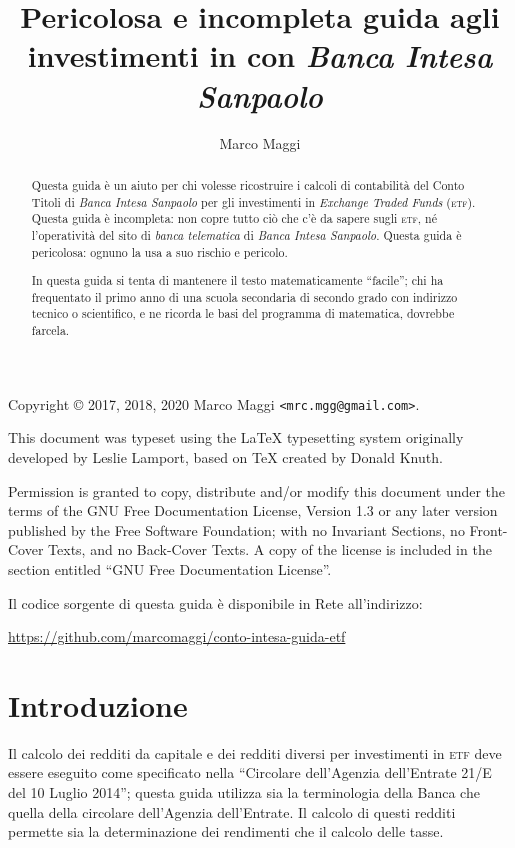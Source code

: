 \documentclass[12pt,a4paper]{article}
\author{Marco Maggi}
\title{Pericolosa e incompleta guida agli investimenti in \Etf{} con \emph{Banca Intesa Sanpaolo}}
\newcommand{\Parentesi}[1]{(#1)}
\newcommand{\Etf}[1]{\textsc{etf}}
\begin{document}
\maketitle

\begin{abstract}
  \noindent
  Questa guida è un  aiuto per chi volesse ricostruire i calcoli di  contabilità del Conto Titoli di
  \emph{Banca   Intesa   Sanpaolo}   per   gli  investimenti   in   \emph{Exchange   Traded   Funds}
  \Parentesi{\Etf{}}.   Questa guida  è incompleta:  non copre  tutto ciò  che c'è  da sapere  sugli
  \Etf{}, né  l'operatività del  sito di  \emph{banca telematica}  di \emph{Banca  Intesa Sanpaolo}.
  Questa guida è pericolosa: ognuno la usa a suo rischio e pericolo.

  In questa guida si  tenta di mantenere il testo matematicamente ``facile'';  chi ha frequentato il
  primo anno  di una scuola secondaria  di secondo grado con  indirizzo tecnico o scientifico,  e ne
  ricorda le basi del programma di matematica, dovrebbe farcela.
\end{abstract}

\tableofcontents

\newpage{}

\noindent
Copyright \copyright{} 2017, 2018, 2020 Marco Maggi \texttt{<mrc.mgg@gmail.com>}.

This  document was  typeset using  the \LaTeX{}  typesetting system  originally developed  by Leslie
Lamport, based on \TeX{} created by Donald Knuth.

Permission is  granted to copy, distribute  and/or modify this document  under the terms of  the GNU
Free  Documentation License,  Version  1.3 or  any  later  version published  by  the Free  Software
Foundation; with no  Invariant Sections, no Front-Cover  Texts, and no Back-Cover Texts.   A copy of
the license is included in the section entitled ``GNU Free Documentation License''.

Il codice sorgente di questa guida è disponibile in Rete all'indirizzo:
\begin{center}
  \url{https://github.com/marcomaggi/conto-intesa-guida-etf}
\end{center}

\newpage{}


\section{Introduzione}


Il calcolo  dei redditi da  capitale e dei  redditi diversi per  investimenti in \Etf{}  deve essere
eseguito come  specificato nella ``Circolare  dell'Agenzia dell'Entrate  21/E del 10  Luglio 2014'';
questa  guida utilizza  sia la  terminologia  della Banca  che quella  della circolare  dell'Agenzia
dell'Entrate.  Il  calcolo di questi  redditi permette sia la  determinazione dei rendimenti  che il
calcolo delle tasse.
\end{document}
